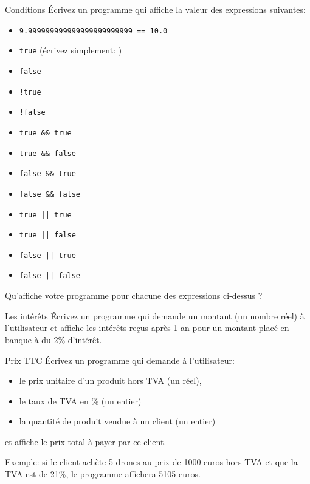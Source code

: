 \documentclass[a4paper,11pt]{article}
\begin{document}
	\begin{Exercice}{Conditions}
		\'Ecrivez un programme qui affiche la valeur des expressions suivantes:
		\begin{itemize}
			\item \texttt{9.999999999999999999999999 == 10.0}
			\item \texttt{true}  (écrivez simplement: )
			\item \texttt{false} 
			\item \texttt{!true} 
			\item \texttt{!false} 
			\item \texttt{true \&\& true} 
			\item \texttt{true \&\& false} 
			\item \texttt{false \&\& true} 
			\item \texttt{false \&\& false} 
			\item \texttt{true || true} 
			\item \texttt{true || false} 
			\item \texttt{false || true} 
			\item \texttt{false || false} 
		\end{itemize}
		
		Qu'affiche votre programme pour chacune des expressions ci-dessus ?
	\end{Exercice}


	\begin{Exercice}{Les intérêts}
		\'Ecrivez un programme qui demande un montant (un nombre réel)
		à l'utilisateur et affiche les intérêts reçus après 1 an pour un montant placé en banque à du 2\% d'intérêt.
	\end{Exercice}

	\begin{Exercice}{Prix TTC}
		\'Ecrivez un programme qui demande à l'utilisateur:
		\begin{itemize}
			\item le prix unitaire d’un produit hors TVA (un réel), 
			\item le taux de TVA en \% (un entier) 
			\item la quantité de produit vendue à un client (un entier)
		\end{itemize}
		et affiche le prix total à payer par ce client.
		
		Exemple: si le client achète 5 drones au prix de 1000 euros hors TVA et que la TVA est de 21\%,
				le programme affichera 5105 euros.
	\end{Exercice}
\end{document}
